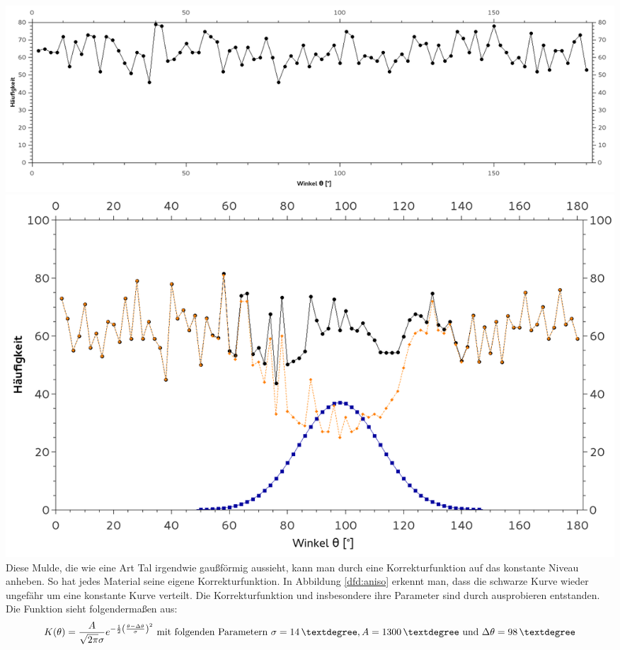        \centering \includegraphics[width=.72\textwidth, height=0.225\textheight]{pic/isotropie.png}
        \label{dfd:iso}
        \centering \includegraphics[width=.75\textwidth, height=0.25\textheight]{pic/KorrekturderAnisotropie.png}
        \label{dfd:aniso}
        \flushleft
        Diese Mulde, die wie eine Art Tal irgendwie gaußförmig aussieht, kann man durch eine Korrekturfunktion auf das konstante Niveau anheben. So hat jedes Material seine eigene Korrekturfunktion.
        In Abbildung \ref{dfd:aniso} erkennt man, dass die schwarze Kurve wieder ungefähr um eine konstante Kurve verteilt.
        Die Korrekturfunktion und insbesondere ihre Parameter sind durch ausprobieren entstanden. Die Funktion sieht folgendermaßen aus: 
        \begin{equation*}
            K(\theta) = \frac{A}{\sqrt{2\pi}\sigma} e^{-\frac{1}{2}\left(\frac{\theta - \Delta \theta}{\sigma}\right)^2} \text{ mit folgenden Parametern } \sigma=\unit[14]{°}, A=\unit[1300]{°} \text{ und } \Delta \theta = \unit[98]{°}
        \end{equation*}
        
